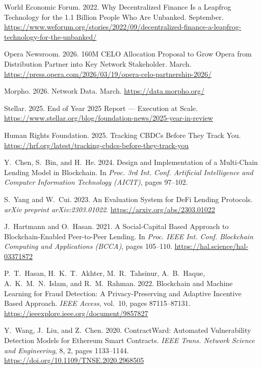 \documentclass[12pt,a4paper]{report}
\begin{document}
{\begin{enumerate}[label={[\arabic*]}]
\item World Economic Forum. 2022. Why Decentralized Finance Is a Leapfrog Technology for the 1.1 Billion People Who Are Unbanked. September. \url{https://www.weforum.org/stories/2022/09/decentralized-finance-a-leapfrog-technology-for-the-unbanked/}

\item Opera Newsroom. 2026. 160M CELO Allocation Proposal to Grow Opera from Distribution Partner into Key Network Stakeholder. March. \url{https://press.opera.com/2026/03/19/opera-celo-partnership-2026/}

\item Morpho. 2026. Network Data. March. \url{https://data.morpho.org/}

\item Stellar. 2025. End of Year 2025 Report --- Execution at Scale. \url{https://www.stellar.org/blog/foundation-news/2025-year-in-review}

\item Human Rights Foundation. 2025. Tracking CBDCs Before They Track You. \url{https://hrf.org/latest/tracking-cbdcs-before-they-track-you}

\item Y.~Chen, S.~Bin, and H.~He. 2024. Design and Implementation of a Multi-Chain Lending Model in Blockchain. In \emph{Proc. 3rd Int. Conf. Artificial Intelligence and Computer Information Technology (AICIT)}, pages 97--102.

\item S.~Yang and W.~Cui. 2023. An Evaluation System for DeFi Lending Protocols. \emph{arXiv preprint arXiv:2303.01022}. \url{https://arxiv.org/abs/2303.01022}

\item J.~Hartmann and O.~Hasan. 2021. A Social-Capital Based Approach to Blockchain-Enabled Peer-to-Peer Lending. In \emph{Proc. IEEE Int. Conf. Blockchain Computing and Applications (BCCA)}, pages 105--110. \url{https://hal.science/hal-03371872}

\item P.~T.~Hasan, H.~K.~T.~Akhter, M.~R.~Tahsinur, A.~B.~Haque, A.~K.~M.~N.~Islam, and R.~M.~Rahman. 2022. Blockchain and Machine Learning for Fraud Detection: A Privacy-Preserving and Adaptive Incentive Based Approach. \emph{IEEE Access}, vol.~10, pages 87115--87131. \url{https://ieeexplore.ieee.org/document/9857827}

\item Y.~Wang, J.~Liu, and Z.~Chen. 2020. ContractWard: Automated Vulnerability Detection Models for Ethereum Smart Contracts. \emph{IEEE Trans. Network Science and Engineering}, 8, 2, pages 1133--1144. \url{https://doi.org/10.1109/TNSE.2020.2968505}


\end{enumerate}}
\end{document}
